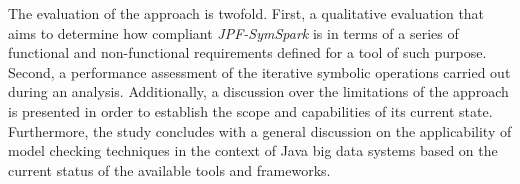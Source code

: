 The evaluation of the approach is twofold. First, a qualitative evaluation that aims to determine how compliant \textit{JPF-SymSpark} is in terms of a series of functional and non-functional requirements defined for a tool of such purpose. Second, a performance assessment of the iterative symbolic operations carried out during an analysis. Additionally, a discussion over the limitations of the approach is presented in order to establish the scope and capabilities of its current state. Furthermore, the study concludes with a general discussion on the applicability of model checking techniques in the context of Java big data systems based on the current status of the available tools and frameworks.